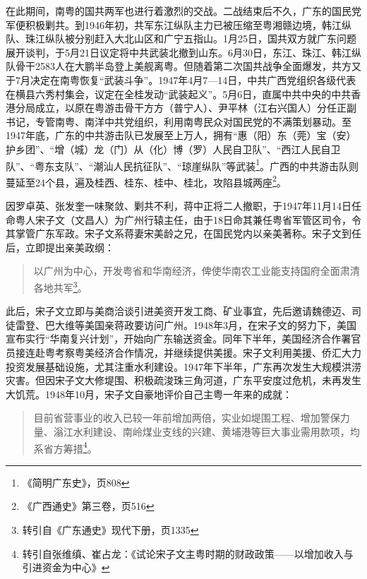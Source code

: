 在此期间，南粤的国共两军也进行着激烈的交战。二战结束后不久，广东的国民党军便积极剿共。到1946年初，共军东江纵队主力已被压缩至粤湘赣边境，韩江纵队、珠江纵队被分别赶入大北山区和广宁五指山。1月25日，国共双方就广东问题展开谈判，于5月21日议定将中共武装北撤到山东。6月30日，东江、珠江、韩江纵队骨干2583人在大鹏半岛登上美舰离粤。但随着第二次国共战争全面爆发，共方又于7月决定在南粤恢复“武装斗争”。1947年4月7—14日，中共广西党组织各级代表在横县六秀村集会，议定在全桂发动“武装起义”。5月6日，直属中共中央的中共香港分局成立，以原在粤游击骨干方方（普宁人）、尹平林（江右兴国人）分任正副书记，专管南粤、南洋中共党组织，利用南粤民众对国民党的不满策划暴动。至1947年底，广东的中共游击队已发展至上万人，拥有“惠（阳）东（莞）宝（安）护乡团”、“增（城）龙（门）从（化）博（罗）人民自卫队”、“西江人民自卫队”、“粤东支队”、“潮汕人民抗征队”、“琼崖纵队”等武装\footnote{《简明广东史》，页808}。广西的中共游击队则蔓延至24个县，遍及桂西、桂东、桂中、桂北，攻陷县城两座\footnote{《广西通史》第三卷，页516}。

因罗卓英、张发奎一味聚敛、剿共不利，蒋中正将二人撤职，于1947年11月14日任命粤人宋子文（文昌人）为广州行辕主任，由于18日命其兼任粤省军管区司令，令其掌管广东军政。宋子文系蒋妻宋美龄之兄，在国民党内以亲美著称。宋子文到任后，立即提出亲美政纲：

\begin{quote}

以广州为中心，开发粤省和华南经济，俾使华南农工业能支持国府全面肃清各地共军\footnote{转引自《广东通史》现代下册，页1335}。

\end{quote}
	
此后，宋子文立即与美商洽谈引进美资开发工商、矿业事宜，先后邀请魏德迈、司徒雷登、巴大维等美国亲蒋政要访问广州。1948年3月，在宋子文的努力下，美国宣布实行“华南复兴计划”，开始向广东输送资金。同年下半年，美国经济合作署官员接连赴粤考察粤美经济合作情况，并继续提供美援。宋子文利用美援、侨汇大力投资发展基础设施，尤其注重水利建设。1947年下半年，广东再次发生大规模洪涝灾害。但因宋子文大修堤围、积极疏浚珠三角河道，广东平安度过危机，未再发生大饥荒。1948年10月，宋子文自豪地评价自己主粤一年来的成就：

\begin{quote}
目前省营事业的收入已较一年前增加两倍，实业如堤围工程、增加警保力量、滃江水利建设、南岭煤业支线的兴建、黄埔港等巨大事业需用款项，均系省方筹措\footnote{转引自张维缜、崔占龙：《试论宋子文主粤时期的财政政策——以增加收入与引进资金为中心》}。

\end{quote}

